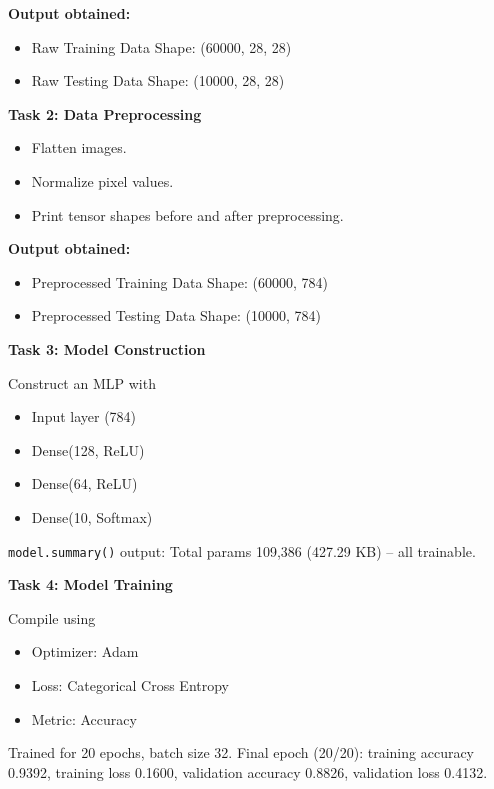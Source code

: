 \documentclass[11pt]{article}
\begin{document}
\textbf{Output obtained:}
\begin{itemize}
\item Raw Training Data Shape: (60000, 28, 28)
\item Raw Testing Data Shape: (10000, 28, 28)
\end{itemize}

\bigskip

\textbf{Task 2: Data Preprocessing}

\begin{itemize}
\item Flatten images.
\item Normalize pixel values.
\item Print tensor shapes before and after preprocessing.
\end{itemize}

\textbf{Output obtained:}
\begin{itemize}
\item Preprocessed Training Data Shape: (60000, 784)
\item Preprocessed Testing Data Shape: (10000, 784)
\end{itemize}

\bigskip

\textbf{Task 3: Model Construction}

Construct an MLP with

\begin{itemize}
\item Input layer (784)
\item Dense(128, ReLU)
\item Dense(64, ReLU)
\item Dense(10, Softmax)
\end{itemize}

\texttt{model.summary()} output: Total params 109,386 (427.29 KB) -- all trainable.

\bigskip

\textbf{Task 4: Model Training}

Compile using

\begin{itemize}
\item Optimizer: Adam
\item Loss: Categorical Cross Entropy
\item Metric: Accuracy
\end{itemize}

Trained for 20 epochs, batch size 32. Final epoch (20/20): training accuracy 0.9392, training loss 0.1600, validation accuracy 0.8826, validation loss 0.4132.
\end{document}
